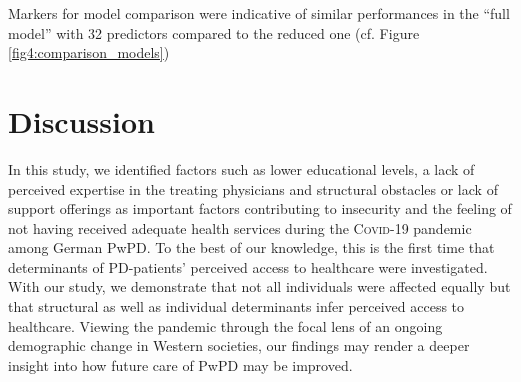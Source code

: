 \documentclass[a4paper,oneside,11pt,english]{scrartcl}
\begin{document}
\begin{table}[ht]
	\caption{Significant factors contibuting to unmet care needs during \textsc{Covid}-19 pandemic according to the reduced \textsc{GLM}:}
	\label{tab2:reduced_model}
	\centering
\end{table}	 

Markers for model comparison were indicative of similar performances in the ``full model'' with 32 predictors compared to the reduced one (cf. Figure \ref{fig4:comparison_models})


\newpage


\section*{Discussion}
In this study, we identified factors such as lower educational levels, a lack of perceived expertise in the treating physicians and structural obstacles or lack of support offerings as important factors contributing to insecurity and the feeling of not having received adequate health services during the \textsc{Covid}-19 pandemic among German Pw\textsc{PD}. To the best of our knowledge, this is the first time that determinants of \textsc{PD}-patients' perceived access to healthcare were investigated. With our study, we demonstrate that not all individuals were affected equally but that structural as well as individual determinants infer perceived access to healthcare. Viewing the pandemic through the focal lens of an ongoing demographic change in Western societies, our findings may render a deeper insight into how future care of Pw\textsc{PD} may be improved. 
\end{document}
